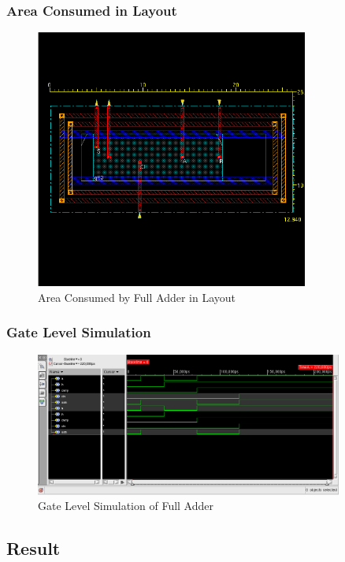 \subsubsection*{Area Consumed in Layout}
\FloatBarrier
\begin{figure}[!htpb]
\centering
\includegraphics[width=0.8\textwidth]{images/layoutarea.png}
\caption{Area Consumed by Full Adder in Layout}
\end{figure}

\subsubsection*{Gate Level Simulation}
\FloatBarrier
\begin{figure}[!htpb]
\centering
\includegraphics[width=0.9\textwidth]{images/gatelevel1.png}
\caption{Gate Level Simulation of Full Adder}
\end{figure}



\subsection*{Result}

